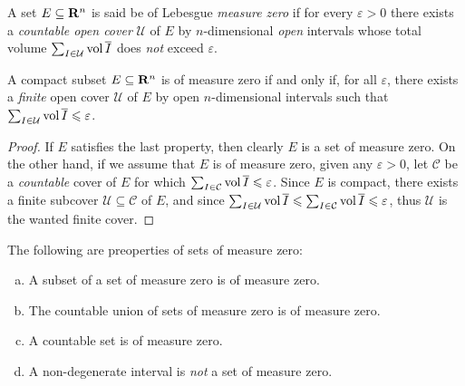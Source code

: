 \begin{definition}
\label{def:measure-zero-set}
A set \(E \subseteq \mathbf{R}^n\) is said be of Lebesgue \emph{measure zero} if for
every \(\varepsilon > 0\) there exists a \emph{countable open cover} \(\mathcal
U\) of \(E\) by \(n\)-dimensional \emph{open} intervals whose total volume
\(\sum_{I \in \mathcal U} \operatorname{vol} \overline{I}\) does \emph{not} exceed
\(\varepsilon\).
\end{definition}

\begin{corollary}
\label{cor:compact-finite-cover-infinitesimal-volume}
A compact subset \(E \subseteq \mathbf{R}^n\) is of measure zero if and only if, for all
\(\varepsilon\), there exists a \emph{finite} open cover \(\mathcal U\) of \(E\)
by open \(n\)-dimensional intervals such that \(\sum_{I \in \mathcal U} \operatorname{vol}
\overline{I} \leqslant \varepsilon\).
\end{corollary}

\begin{proof}
If \(E\) satisfies the last property, then clearly \(E\) is a set of measure
zero. On the other hand, if we assume that \(E\) is of measure zero, given any
\(\varepsilon > 0\), let \(\mathcal C\) be a \emph{countable} cover of \(E\) for
which \(\sum_{I \in \mathcal C} \operatorname{vol} \overline{I} \leqslant \varepsilon\). Since
\(E\) is compact, there exists a finite subcover \(\mathcal U \subseteq \mathcal
C\) of \(E\), and since \(\sum_{I \in \mathcal U} \operatorname{vol} \overline{I} \leqslant \sum_{I
\in \mathcal C} \operatorname{vol} \overline{I} \leqslant \varepsilon\), thus \(\mathcal U\) is the
wanted finite cover.
\end{proof}

\begin{lemma}
\label{lem:measure-zero-properties}
The following are preoperties of sets of measure zero:
\begin{enumerate}[(a)]\setlength\itemsep{0em}
\item A subset of a set of measure zero is of measure zero.
\item The countable union of sets of measure zero is of measure zero.
\item A countable set is of measure zero.
\item A non-degenerate interval is \emph{not} a set of measure zero.
\end{enumerate}
\end{lemma}

